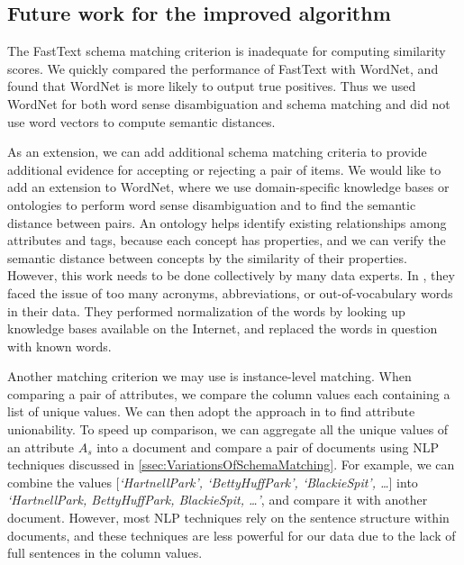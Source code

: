 \subsection{Future work for the improved algorithm}

The FastText schema matching criterion is inadequate for computing similarity scores. We quickly compared the performance of FastText with WordNet, and found that WordNet is more likely to output true positives. Thus we used WordNet for both word sense disambiguation and schema matching and did not use word vectors to compute semantic distances.

As an extension, we can add additional schema matching criteria to provide additional evidence for accepting or rejecting a pair of items. We would like to add an extension to WordNet, where we use domain-specific knowledge bases or ontologies to perform word sense disambiguation and to find the semantic distance between pairs. An ontology helps identify existing relationships among attributes and tags, because each concept has properties, and we can verify the semantic distance between concepts by the similarity of their properties. However, this work needs to be done collectively by many data experts. In \cite{Sorrentino2011NORMS}, they faced the issue of too many acronyms, abbreviations, or out-of-vocabulary words in their data. They performed normalization of the words by looking up knowledge bases available on the Internet, and replaced the words in question with known words.

Another matching criterion we may use is instance-level matching. When comparing a pair of attributes, we compare the column values each containing a list of unique values. We can then adopt the approach in \cite{Nargesian2018Table} to find attribute unionability. To speed up comparison, we can aggregate all the unique values of an attribute $A_s$ into a document and compare a pair of documents using NLP techniques discussed in \autoref{ssec:VariationsOfSchemaMatching}. For example, we can combine the values [\textit{`HartnellPark', `BettyHuffPark', `BlackieSpit', \ldots}] into\\ \textit{`HartnellPark, BettyHuffPark, BlackieSpit, \ldots'}, and compare it with another document. However, most NLP techniques rely on the sentence structure within documents, and these techniques are less powerful for our data due to the lack of full sentences in the column values.

